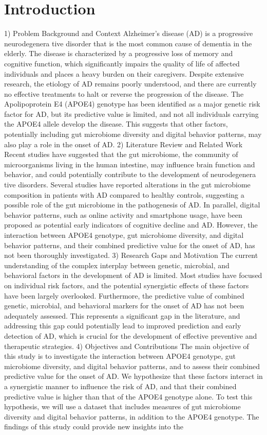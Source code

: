 \documentclass[conference]{IEEEtran}
\begin{document}
\section{Introduction}
1) Problem Background and Context Alzheimer's disease (AD) is a progressive neurodegenera tive disorder that is the most common cause of dementia in the elderly. The disease is characterized by a progressive loss of memory and cognitive function, which significantly impairs the quality of life of affected individuals and places a heavy burden on their caregivers. Despite extensive research, the etiology of AD remains poorly understood, and there are currently no effective treatments to halt or reverse the progression of the disease. The Apolipoprotein E4 (APOE4) genotype has been identified as a major genetic risk factor for AD, but its predictive value is limited, and not all individuals carrying the APOE4 allele develop the disease. This suggests that other factors, potentially including gut microbiome diversity and digital behavior patterns, may also play a role in the onset of AD. 2) Literature Review and Related Work Recent studies have suggested that the gut microbiome, the community of microorganisms living in the human intestine, may influence brain function and behavior, and could potentially contribute to the development of neurodegenera tive disorders. Several studies have reported alterations in the gut microbiome composition in patients with AD compared to healthy controls, suggesting a possible role of the gut microbiome in the pathogenesis of AD. In parallel, digital behavior patterns, such as online activity and smartphone usage, have been proposed as potential early indicators of cognitive decline and AD. However, the interaction between APOE4 genotype, gut microbiome diversity, and digital behavior patterns, and their combined predictive value for the onset of AD, has not been thoroughly investigated. 3) Research Gaps and Motivation The current understanding of the complex interplay between genetic, microbial, and behavioral factors in the development of AD is limited. Most studies have focused on individual risk factors, and the potential synergistic effects of these factors have been largely overlooked. Furthermore, the predictive value of combined genetic, microbial, and behavioral markers for the onset of AD has not been adequately assessed. This represents a significant gap in the literature, and addressing this gap could potentially lead to improved prediction and early detection of AD, which is crucial for the development of effective preventive and therapeutic strategies. 4) Objectives and Contributions The main objective of this study is to investigate the interaction between APOE4 genotype, gut microbiome diversity, and digital behavior patterns, and to assess their combined predictive value for the onset of AD. We hypothesize that these factors interact in a synergistic manner to influence the risk of AD, and that their combined predictive value is higher than that of the APOE4 genotype alone. To test this hypothesis, we will use a dataset that includes measures of gut microbiome diversity and digital behavior patterns, in addition to the APOE4 genotype. The findings of this study could provide new insights into the 
\end{document}
